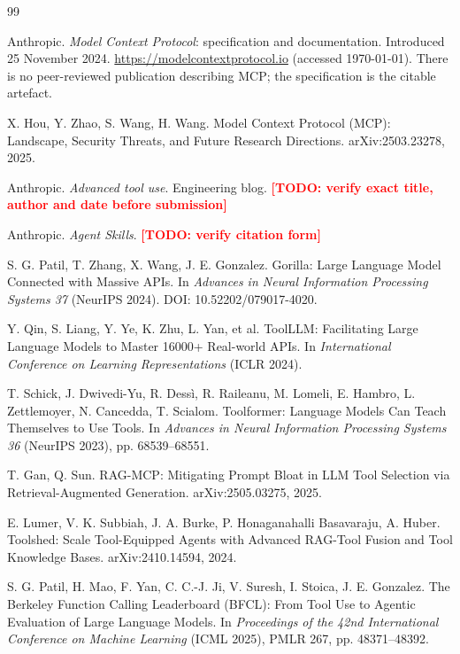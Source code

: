 \documentclass[11pt]{article}
\newcommand{\TODO}[1]{\textcolor{red}{\textbf{[TODO: #1]}}}
\begin{document}
\begin{thebibliography}{99}
\footnotesize

 Anthropic. \emph{Model Context Protocol}: specification and
documentation. Introduced 25 November 2024. \url{https://modelcontextprotocol.io}
(accessed \today). There is no peer-reviewed publication describing MCP; the
specification is the citable artefact.

 X. Hou, Y. Zhao, S. Wang, H. Wang. Model Context Protocol (MCP):
Landscape, Security Threats, and Future Research Directions. arXiv:2503.23278, 2025.

 Anthropic. \emph{Advanced tool use}. Engineering
blog. \TODO{verify exact title, author and date before submission}

 Anthropic. \emph{Agent Skills}. \TODO{verify citation form}

 S. G. Patil, T. Zhang, X. Wang, J. E. Gonzalez. Gorilla: Large
Language Model Connected with Massive APIs. In \emph{Advances in Neural Information
Processing Systems 37} (NeurIPS 2024). DOI: 10.52202/079017-4020.

 Y. Qin, S. Liang, Y. Ye, K. Zhu, L. Yan, et al. ToolLLM: Facilitating
Large Language Models to Master 16000+ Real-world APIs. In \emph{International Conference
on Learning Representations} (ICLR 2024).

 T. Schick, J. Dwivedi-Yu, R. Dess\`i, R. Raileanu, M. Lomeli,
E. Hambro, L. Zettlemoyer, N. Cancedda, T. Scialom. Toolformer: Language Models Can Teach
Themselves to Use Tools. In \emph{Advances in Neural Information Processing Systems 36}
(NeurIPS 2023), pp. 68539--68551.

 T. Gan, Q. Sun. RAG-MCP: Mitigating Prompt Bloat in LLM Tool Selection
via Retrieval-Augmented Generation. arXiv:2505.03275, 2025.

 E. Lumer, V. K. Subbiah, J. A. Burke, P. Honaganahalli Basavaraju,
A. Huber. Toolshed: Scale Tool-Equipped Agents with Advanced RAG-Tool Fusion and Tool
Knowledge Bases. arXiv:2410.14594, 2024.

 S. G. Patil, H. Mao, F. Yan, C. C.-J. Ji, V. Suresh, I. Stoica,
J. E. Gonzalez. The Berkeley Function Calling Leaderboard (BFCL): From Tool Use to Agentic
Evaluation of Large Language Models. In \emph{Proceedings of the 42nd International
Conference on Machine Learning} (ICML 2025), PMLR 267, pp. 48371--48392.


\end{thebibliography}
\end{document}
